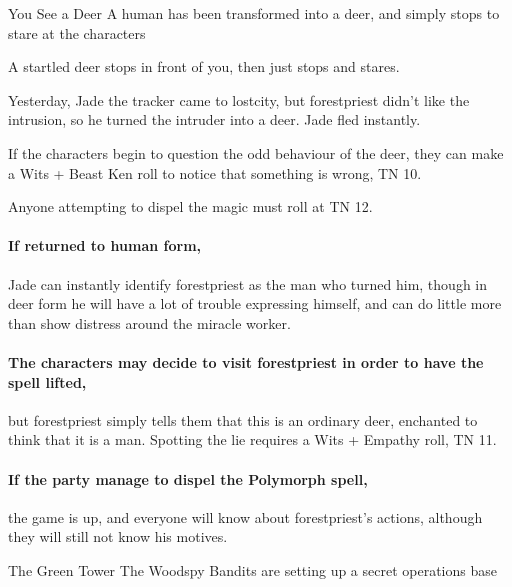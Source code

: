 \begin{multicols}{2}
\forestpriest

{You See a Deer}%
{A human has been transformed into a deer, and simply stops to stare at the characters}%

\begin{boxtext}

	A startled deer stops in front of you, then just stops and stares.

\end{boxtext}

Yesterday, Jade the tracker came to \gls{lostcity}, but \gls{forestpriest} didn't like the intrusion, so he turned the intruder into a deer.
Jade fled instantly.

If the characters begin to question the odd behaviour of the deer, they can make a Wits + Beast Ken roll to notice that something is wrong, TN 10.

Anyone attempting to dispel the magic must roll at TN 12.


\paragraph{If returned to human form,}
Jade can instantly identify \gls{forestpriest} as the man who turned him, though in deer form he will have a lot of trouble expressing himself, and can do little more than show distress around the miracle worker.

\paragraph{The characters may decide to visit \gls{forestpriest} in order to have the spell lifted,}
but \gls{forestpriest} simply tells them that this is an ordinary deer, enchanted to think that it is a man.
Spotting the lie requires a Wits + Empathy roll, TN 11.

\paragraph{If the party manage to dispel the Polymorph spell,}
the game is up, and everyone will know about \gls{forestpriest}'s actions, although they will still not know his motives.

{The Green Tower}%
{The Woodspy Bandits are setting up a secret operations base}%


\end{multicols}
